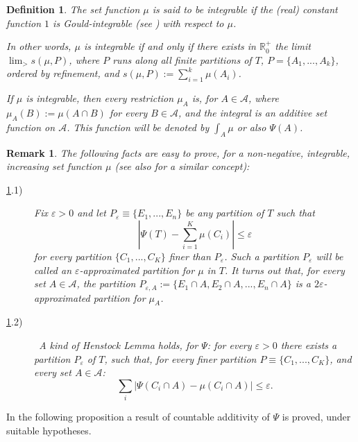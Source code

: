 \documentclass[11pt,a4paper,twoside]{amsart}
\newtheorem{definition}[theorem]{Definition}
\newtheorem{remark}[theorem]{Remark}
\begin{document}
\begin{definition}\label{muintegrabile}\rm
The set function $\mu$ is said to be {\em integrable} if the (real) constant function $1$ is Gould-integrable (see \cite[Definition 4.5]{cg2014}) with respect to $\mu$. 

In other words,  $\mu$ is integrable if and only if there exists in ${\mathbb{R}}^+_0$ the limit $\lim_{>}s(\mu,P)$, where $P$ runs along all finite partitions of $T$, $P=\{A_1,...,A_k\}$, ordered by refinement, and $s(\mu,P):=\sum_{i=1}^k\mu(A_i)$.
  
If $\mu$ is integrable, then every {\em restriction} $\mu_A$ is, for $A\in {\mathcal{{A}}}$, where $\mu_A(B):=\mu(A\cap B)$ for every $B\in {\mathcal{{A}}}$, and the integral is an additive set function on ${\mathcal{{A}}}$. This function will be denoted by $\int_A\mu$ or also $\Psi(A)$.
\end{definition}

\begin{remark}\label{fatti-p}\rm
The following facts are easy to prove, for a non-negative, integrable, increasing set function $\mu$ (see also \cite[Definition 4.5]{ccgs2014} for a similar concept):
\begin{description}
\item[\rm \ref{fatti-p}.1)]
Fix ${\varepsilon}>0$ and let $P_{\varepsilon}\equiv\{E_1,...,E_n\}$ be any partition of $T$ such that
$$|\Psi(T) -\sum_{i=1}^K\mu(C_i)|\leq {\varepsilon}$$
for every partition $\{C_1,...,C_K\}$ finer than $P_{\varepsilon}$. Such a partition $P_{\varepsilon}$ will be called an ${\varepsilon}$-approximated partition for $\mu$ in $T$. It turns out that, for every set $A\in {\mathcal{{A}}}$, the partition 
$P_{{\varepsilon},A}:=\{E_1\cap A,E_2\cap A,...,E_n\cap A\}$ is a
$2{\varepsilon}$-approximated partition for $\mu_A$.
\item[\rm \ref{fatti-p}.2)] \
A kind of {\em Henstock Lemma} holds, for $\Psi$: for every ${\varepsilon}>0$ there exists a partition $P_{\varepsilon}$ of $T$, such that, for every finer partition $P\equiv\{C_1,...,C_K\}$, and every set $A\in {\mathcal{{A}}}$:
$$\sum_i|\Psi(C_i\cap A)-\mu(C_i\cap A)|\leq {\varepsilon}.$$
\end{description} 
\end{remark}
In the following proposition a result of countable additivity of $\Psi$ is proved, under suitable hypotheses.
\end{document}
